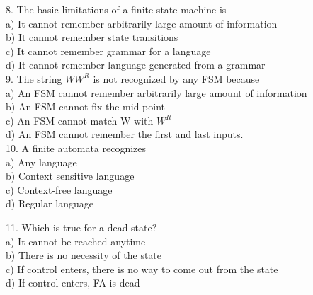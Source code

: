 \documentclass{article}
\begin{document}
\vspace*{0.2cm}
8. The basic limitations of a finite state machine is \\
\hspace*{0.5cm} a) It cannot remember arbitrarily large amount of information \\
\hspace*{0.5cm} b) It cannot remember state transitions \\
\hspace*{0.5cm} c) It cannot remember grammar for a language \\
\hspace*{0.5cm} d) It cannot remember language generated from a grammar \\

\vspace*{0.2cm}
9. The string $WW^R$ is not recognized by any FSM because \\
\hspace*{0.5cm} a) An FSM cannot remember arbitrarily large amount of information\\
\hspace*{0.5cm} b) An FSM cannot fix the mid-point \\
\hspace*{0.5cm} c) An FSM cannot match W with $W^R$ \\
\hspace*{0.5cm} d) An FSM cannot remember the first and last inputs.\\

\vspace*{0.2cm}
10. A finite automata recognizes\\
\hspace*{0.5cm} a) Any language\\
\hspace*{0.5cm} b) Context sensitive language \\
\hspace*{0.5cm} c) Context-free language \\
\hspace*{0.5cm} d) Regular language \\

\vspace*{0.2cm}

11. Which is true for a dead state?\\
\hspace*{0.5cm} a) It cannot be reached anytime \\
\hspace*{0.5cm} b) There is no necessity of the state \\
\hspace*{0.5cm} c) If control enters, there is no way to come out from the state \\
\hspace*{0.5cm} d) If control enters, FA is dead \\
\end{document}

